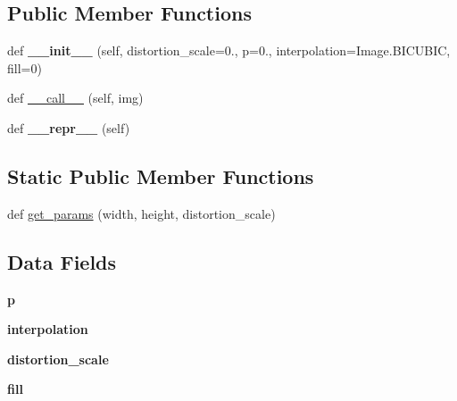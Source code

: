 \subsection*{Public Member Functions}
\begin{DoxyCompactItemize}
\item 
\mbox{\label{classtorchvision_1_1transforms_1_1transforms_1_1RandomPerspective_a698b5e559722415008ebea4416d55cf1}} 
def {\bfseries \+\_\+\+\_\+init\+\_\+\+\_\+} (self, distortion\+\_\+scale=0., p=0., interpolation=Image.\+B\+I\+C\+U\+B\+IC, fill=0)
\item 
def \hyperlink{classtorchvision_1_1transforms_1_1transforms_1_1RandomPerspective_ab795687134e8cde452910c968763382a}{\+\_\+\+\_\+call\+\_\+\+\_\+} (self, img)
\item 
\mbox{\label{classtorchvision_1_1transforms_1_1transforms_1_1RandomPerspective_a115cf49be54f38afbc0d2ba4651d0244}} 
def {\bfseries \+\_\+\+\_\+repr\+\_\+\+\_\+} (self)
\end{DoxyCompactItemize}
\subsection*{Static Public Member Functions}
\begin{DoxyCompactItemize}
\item 
def \hyperlink{classtorchvision_1_1transforms_1_1transforms_1_1RandomPerspective_a3f5ee3ba51cbc4eb7b003f7b8172c09f}{get\+\_\+params} (width, height, distortion\+\_\+scale)
\end{DoxyCompactItemize}
\subsection*{Data Fields}
\begin{DoxyCompactItemize}
\item 
\mbox{\label{classtorchvision_1_1transforms_1_1transforms_1_1RandomPerspective_a0be5e7c91f527af62cd5add45553e936}} 
{\bfseries p}
\item 
\mbox{\label{classtorchvision_1_1transforms_1_1transforms_1_1RandomPerspective_a5607c088d5fb0826a219df2c10f4808d}} 
{\bfseries interpolation}
\item 
\mbox{\label{classtorchvision_1_1transforms_1_1transforms_1_1RandomPerspective_a938993075eb32590f2bbe87cf5a8a887}} 
{\bfseries distortion\+\_\+scale}
\item 
\mbox{\label{classtorchvision_1_1transforms_1_1transforms_1_1RandomPerspective_abf45828a978ec991cc11bc13b0e834b0}} 
{\bfseries fill}
\end{DoxyCompactItemize}


